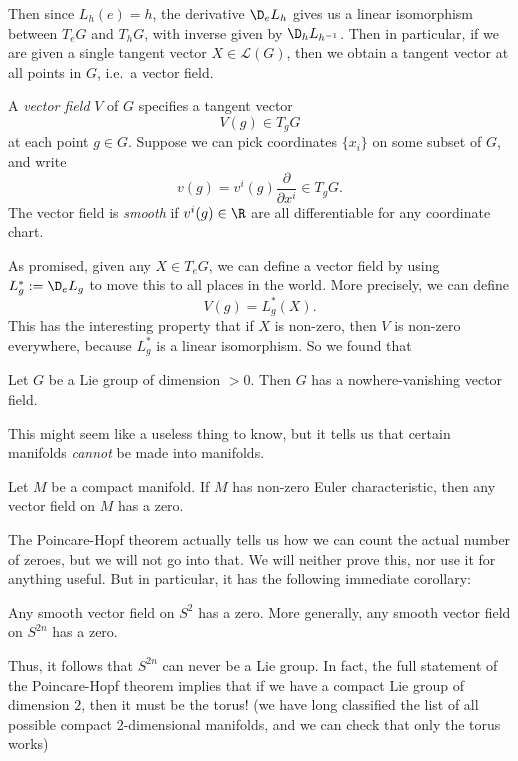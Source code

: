 \documentclass[a4paper]{article}
\begin{document}
Then since $L_h(e) = h$, the derivative $\D_e L_h$ gives us a linear isomorphism between $T_e G$ and $T_h G$, with inverse given by $\D_h L_{h^{-1}}$. Then in particular, if we are given a single tangent vector $X \in \mathcal{L}(G)$, then we obtain a tangent vector at all points in $G$, i.e.\ a vector field.

\begin{defi}
  A \emph{vector field} $V$ of $G$ specifies a tangent vector
  \[
    V(g) \in T_gG
  \]
  at each point $g \in G$. Suppose we can pick coordinates $\{x_i\}$ on some subset of $G$, and write
  \[
    v(g) = v^i (g) \frac{\partial}{\partial x^i} \in T_g G.
  \]
  The vector field is \emph{smooth} if $v^i(g) \in \R$ are all differentiable for any coordinate chart.
\end{defi}

As promised, given any $X \in T_eG$, we can define a vector field by using $L_g^* := \D_e L_g$ to move this to all places in the world. More precisely, we can define
\[
  V(g) = L_g^*(X).
\]
This has the interesting property that if $X$ is non-zero, then $V$ is non-zero everywhere, because $L_g^*$ is a linear isomorphism. So we found that

\begin{prop}
  Let $G$ be a Lie group of dimension $> 0$. Then $G$ has a nowhere-vanishing vector field.
\end{prop}
This might seem like a useless thing to know, but it tells us that certain manifolds \emph{cannot} be made into manifolds.

\begin{thm}
  Let $M$ be a compact manifold. If $M$ has non-zero Euler characteristic, then any vector field on $M$ has a zero.
\end{thm}
The Poincare-Hopf theorem actually tells us how we can count the actual number of zeroes, but we will not go into that. We will neither prove this, nor use it for anything useful. But in particular, it has the following immediate corollary:
\begin{thm}
  Any smooth vector field on $S^2$ has a zero. More generally, any smooth vector field on $S^{2n}$ has a zero.
\end{thm}
Thus, it follows that $S^{2n}$ can never be a Lie group. In fact, the full statement of the Poincare-Hopf theorem implies that if we have a compact Lie group of dimension $2$, then it must be the torus! (we have long classified the list of all possible compact 2-dimensional manifolds, and we can check that only the torus works)
\end{document}
